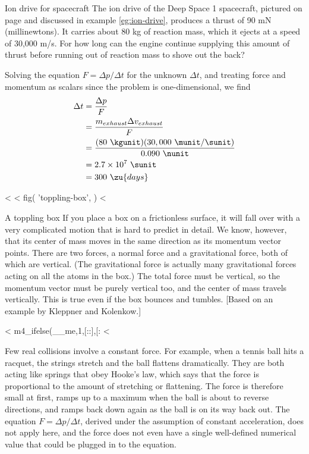\begin{eg}{Ion drive for spacecraft}
\egquestion The ion drive of the Deep Space 1 spacecraft,
pictured on page \pageref{fig:ion-drive} and discussed in example
\ref{eg:ion-drive}, produces a thrust of 90 mN
(millinewtons). It carries about 80 kg of reaction mass,
which it ejects at a speed of 30,000 m/s. For how long can
the engine continue supplying this amount of thrust before
running out of reaction mass to shove out the back?

\eganswer Solving the equation $F=\Delta p/\Delta t$ for
the unknown $\Delta t$, and treating force and momentum as
scalars since the problem is one-dimensional, we find
\begin{align*}
 \Delta t &= \frac{\Delta p}{F} \\
 &= \frac{m_{exhaust}\Delta v_{exhaust}}{F} \\
 &= \frac{(80\ \kgunit)(30,000\ \munit/\sunit)}{0.090\ \nunit}\\
 &= 2.7\times10^7\ \sunit \\
 &= 300\ \zu{days}
\end{align*}
\end{eg}

<%
<%
  fig(
    'toppling-box',
  )
<%
\begin{eg}{A toppling box}\label{eg:toppling-box}
If you place a box on a frictionless surface, it will fall
over with a very complicated motion that is hard to predict
in detail. We know, however, that its center of mass moves
in the same direction as its momentum vector points. There
are two forces, a normal force and a gravitational force,
both of which are vertical. (The gravitational force is
actually many gravitational forces acting on all the atoms
in the box.) The total force must be vertical, so the
momentum vector must be purely vertical too, and the center
of mass travels vertically. This is true even if the box
bounces and tumbles. [Based on an example by Kleppner and Kolenkow.]
\end{eg}

  <%
m4_ifelse(__me,1,[::],[:
  <%

Few real collisions involve a constant force. For example,
when a tennis ball hits a racquet, the strings stretch and
the ball flattens dramatically. They are both acting like
springs that obey Hooke's law, which says that the force is
proportional to the amount of stretching or flattening. The
force is therefore small at first, ramps up to a maximum
when the ball is about to reverse directions, and ramps back
down again as the ball is on its way back out. The equation
$F=\Delta p/\Delta t$, derived under the assumption of
constant acceleration, does not apply here, and the force
does not even have a single well-defined numerical value
that could be plugged in to the equation.

